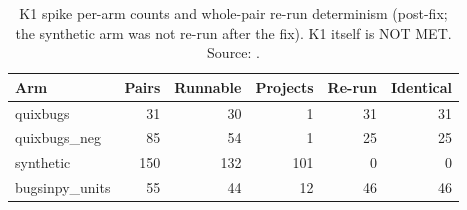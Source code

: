 \begin{table}[t]
\centering\scriptsize
\caption{K1 spike per-arm counts and whole-pair re-run determinism (post-fix; the synthetic arm was not re-run after the fix). K1 itself is NOT MET. Source: .}
\label{tab:k1}
\begin{tabular}{lrrrrr}
\hline
Arm & Pairs & Runnable & Projects & Re-run & Identical \\
\hline
quixbugs & 31 & 30 & 1 & 31 & 31 \\
quixbugs\_neg & 85 & 54 & 1 & 25 & 25 \\
synthetic & 150 & 132 & 101 & 0 & 0 \\
bugsinpy\_units & 55 & 44 & 12 & 46 & 46 \\
\hline
\end{tabular}
\end{table}
